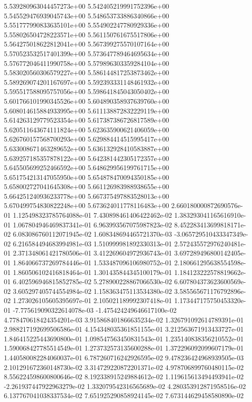 5.539280963044457273e+00
5.542405219991752396e+00
5.545529476939045743e+00
5.548653733886340866e+00
5.551777990833635101e+00
5.554902247780929336e+00
5.558026504728223571e+00
5.561150761675517806e+00
5.564275018622812041e+00
5.567399275570107164e+00
5.570523532517401399e+00
5.573647789464695634e+00
5.576772046411990758e+00
5.579896303359284104e+00
5.583020560306579227e+00
5.586144817253873462e+00
5.589269074201167697e+00
5.592393331148461932e+00
5.595517588095757056e+00
5.598641845043050402e+00
5.601766101990345526e+00
5.604890358937639760e+00
5.608014615884933995e+00
5.611138872832229119e+00
5.614263129779523354e+00
5.617387386726817589e+00
5.620511643674111824e+00
5.623635900621406059e+00
5.626760157568700293e+00
5.629884414515995417e+00
5.633008671463289652e+00
5.636132928410583887e+00
5.639257185357878122e+00
5.642381442305172357e+00
5.645505699252466592e+00
5.648629956199761715e+00
5.651754213147055950e+00
5.654878470094350185e+00
5.658002727041645308e+00
5.661126983988938655e+00
5.664251240936233778e+00
5.667375497883528013e+00
5.670499754830822248e+00
5.673624011778116483e+00
2.660180000872690576e-01
1.125498323785764088e-01
7.430898461406422462e-02
1.383293041165616910e-01
1.067804946469837341e-01
6.963993567075987823e-02
8.452283413699818171e-02
6.083086760112071945e-02
1.608348694465721370e-03
-3.065729510433347349e-02
6.216584494683994981e-03
1.510999981892330313e-01
2.572435572976240481e-01
2.371348061421780506e-01
3.412269604972936743e-01
3.697289496800142405e-01
1.864066737269784446e-01
1.533487096106980752e-01
2.180661295638554598e-01
1.860506102416818464e-01
1.301435844345100179e-01
1.184123222578819662e-01
6.402596946815852785e-02
5.278900228867066530e-02
6.607804373623600569e-02
3.605297405744554984e-02
1.158363475113534380e-02
3.585565671176792896e-02
1.273026105605395697e-01
2.105021189992307418e-01
1.173447175750453320e-01
-7.775619090322614078e-03
-1.475424249646617100e-02
4.778470618424354201e-03
3.915868401866635234e-02
1.326791092614789391e-01
2.988217192699506586e-01
4.154348035361851155e-01
3.212563671913433727e-01
1.846415225443690800e-01
1.098547563450831543e-01
1.235140838356210552e-01
1.590068427785514549e-01
1.273732573135600288e-01
1.372296092099607179e-01
1.440580082284060037e-01
6.787260716242926595e-02
9.478236424968939505e-03
2.101291672360148730e-02
3.314729220872201371e-02
4.978706899760480115e-02
8.556224598600800646e-02
8.192338915249884612e-02
1.119615613494493941e-02
-2.261937447922963279e-02
1.332079542316565689e-02
4.280353912871958516e-02
6.137767041038337534e-02
7.651925290858924145e-02
7.673144629458580890e-02
